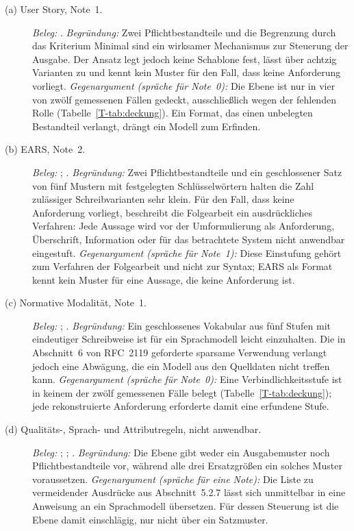 \documentclass[11pt,a4paper]{report}
\begin{document}
\begin{description}
  \item[(a) User Story, Note~1.]
  \emph{Beleg:} \cite[Tab.~1, Abschn.~2 und 3.2.2]{lucassen2016qus}.
  \emph{Begründung:} Zwei Pflichtbestandteile und die Begrenzung durch
  das Kriterium Minimal sind ein wirksamer Mechanismus zur Steuerung der
  Ausgabe. Der Ansatz legt jedoch keine Schablone fest, lässt über
  achtzig Varianten zu und kennt kein Muster für den Fall, dass keine
  Anforderung vorliegt.
  \emph{Gegenargument (spräche für Note~0):} Die Ebene ist nur in vier
  von zwölf gemessenen Fällen gedeckt, ausschließlich wegen der fehlenden Rolle (Tabelle~\ref{T-tab:deckung}). Ein Format, das einen unbelegten
  Bestandteil verlangt, drängt ein Modell zum Erfinden.

  \item[(b) EARS, Note~2.]
  \emph{Beleg:} \cite[Abschn.~4.1--4.6]{mavin2009ears};
  \cite[Abschn.~Method]{mavin2010bigears}.
  \emph{Begründung:} Zwei Pflichtbestandteile und ein geschlossener Satz
  von fünf Mustern mit festgelegten Schlüsselwörtern halten die Zahl
  zulässiger Schreibvarianten sehr klein. Für den Fall, dass keine
  Anforderung vorliegt, beschreibt die Folgearbeit ein ausdrückliches
  Verfahren: Jede Aussage wird vor der Umformulierung als Anforderung,
  Überschrift, Information oder für das betrachtete System nicht
  anwendbar eingestuft.
  \emph{Gegenargument (spräche für Note~1):} Diese Einstufung gehört zum
  Verfahren der Folgearbeit und nicht zur Syntax; EARS als Format kennt
  kein Muster für eine Aussage, die keine Anforderung ist.

  \item[(c) Normative Modalität, Note~1.]
  \emph{Beleg:} \cite[Abschn.~1--6]{rfc2119}; \cite[Abschn.~2]{rfc8174}.
  \emph{Begründung:} Ein geschlossenes Vokabular aus fünf Stufen mit
  eindeutiger Schreibweise ist für ein Sprachmodell leicht einzuhalten.
  Die in Abschnitt~6 von RFC~2119 geforderte sparsame Verwendung
  verlangt jedoch eine Abwägung, die ein Modell aus den Quelldaten nicht
  treffen kann.
  \emph{Gegenargument (spräche für Note~0):} Eine Verbindlichkeitsstufe
  ist in keinem der zwölf gemessenen Fälle belegt
  (Tabelle~\ref{T-tab:deckung}); jede rekonstruierte Anforderung erforderte
  damit eine erfundene Stufe.

  \item[(d) Qualitäts-, Sprach- und Attributregeln, nicht anwendbar.]
  \emph{Beleg:} \cite[Abschn.~5.2.5--5.2.8]{iso29148};
  \cite[Tab.~1]{lucassen2016qus};
  \cite[Abschn.~Testing the Hypothesis]{mavin2010bigears}.
  \emph{Begründung:} Die Ebene gibt weder ein Ausgabemuster noch
  Pflichtbestandteile vor, während alle drei Ersatzgrößen ein solches
  Muster voraussetzen.
  \emph{Gegenargument (spräche für eine Note):} Die Liste zu vermeidender
  Ausdrücke aus Abschnitt~5.2.7 lässt sich unmittelbar in eine Anweisung
  an ein Sprachmodell übersetzen. Für dessen Steuerung ist die Ebene
  damit einschlägig, nur nicht über ein Satzmuster.
\end{description}
\end{document}
